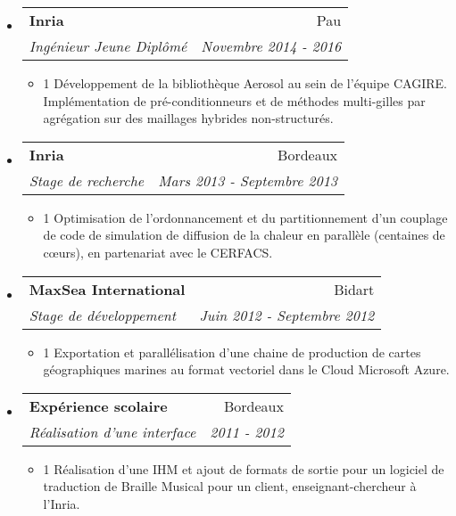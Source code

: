 \documentclass[letterpaper,11pt]{article}
\makeatletter
\newcommand{\resitem}[1]{\item[] \begin{spacing}{1} #1 \end{spacing} \vspace{0pt}}
\newcommand{\ressubheading}[4]{
\begin{tabular*}{6.5in}{l@{\cftdotfill{\cftsecdotsep}\extracolsep{\fill}}r}
  \textbf{#1} & #2 \\
  \textit{#3} & \textit{#4} \\
\end{tabular*}\vspace{0pt}}
\newcommand\sizetopsepforbigenum{10pt}
\makeatother
\begin{document}
\begin{itemize}[noitemsep,topsep=\sizetopsepforbigenum,parsep=0pt,partopsep=0pt]
\item[]
  \ressubheading{Inria}{Pau}{Ingénieur Jeune Diplômé}{Novembre 2014 - 2016}
  \begin{itemize}[noitemsep,topsep=0pt,parsep=0pt,partopsep=0pt]
    \resitem{Développement de la bibliothèque Aerosol au sein de l'équipe CAGIRE. Implémentation de pré-conditionneurs et de méthodes multi-gilles par agrégation sur des maillages hybrides non-structurés.}
  \end{itemize}
\item[]
  \ressubheading{Inria}{Bordeaux}{Stage de recherche}{Mars 2013 - Septembre 2013}
  \begin{itemize}[noitemsep,topsep=0pt,parsep=0pt,partopsep=0pt]
    \resitem{Optimisation de l'ordonnancement et du partitionnement d'un couplage de code de simulation de diffusion de la chaleur en parallèle (centaines de c\oe urs), en partenariat avec le CERFACS.}
  \end{itemize}
\item[]
  \ressubheading{MaxSea International}{Bidart}{Stage de développement}{Juin 2012 - Septembre 2012}
  \begin{itemize}[noitemsep,topsep=0pt,parsep=0pt,partopsep=0pt]
    \resitem{Exportation et parallélisation d'une chaine de production de cartes géographiques marines au format vectoriel dans le Cloud Microsoft Azure.}
  \end{itemize}  
\item[] 
  \ressubheading{Expérience scolaire}{Bordeaux}{Réalisation d'une interface}{2011 - 2012}
  \begin{itemize}[noitemsep,topsep=0pt,parsep=0pt,partopsep=0pt]
    \resitem{Réalisation d'une IHM et ajout de formats de sortie pour un logiciel de traduction de Braille Musical
      pour un client, enseignant-chercheur à l'Inria.}
  \end{itemize}  
\end{itemize}
\end{document}
